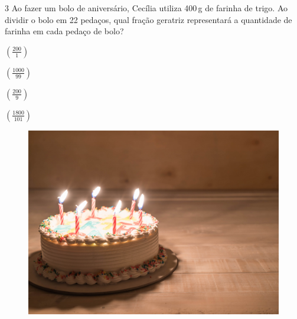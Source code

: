







\num{3} Ao fazer um bolo de aniversário, Cecília utiliza 400\,g de farinha de
trigo. Ao dividir o bolo em 22 pedaços, qual fração geratriz
representará a quantidade de farinha em cada pedaço de bolo?

\begin{escolha}[itemsep=0pt]
\item $(\frac{200}{1})$ 
\item $(\frac{1000}{99})$ 
\item $(\frac{200}{9})$ 
\item $(\frac{1800}{101})$ 
\end{escolha}

\begin{figure}[H]
\centering\includegraphics[width=\textwidth,keepaspectratio]{./imgSAEB_8_MAT/media/image64.png}
\end{figure}

